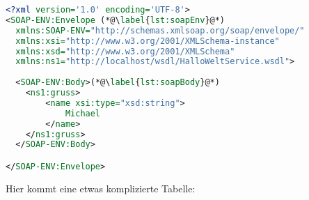 \begin{center}
\begin{lstlisting}[caption={SOAP Anfrage an einen HalloWelt-Web-Service},label=lst:soap,language=XML,label={lst:soap}]
<?xml version='1.0' encoding='UTF-8'>
<SOAP-ENV:Envelope (*@\label{lst:soapEnv}@*)
  xmlns:SOAP-ENV="http://schemas.xmlsoap.org/soap/envelope/"
  xmlns:xsi="http://www.w3.org/2001/XMLSchema-instance"
  xmlns:xsd="http://www.w3.org/2001/XMLSchema"
  xmlns:ns1="http://localhost/wsdl/HalloWeltService.wsdl">
  
  <SOAP-ENV:Body>(*@\label{lst:soapBody}@*)
  	<ns1:gruss>
  		<name xsi:type="xsd:string">
  			Michael
  		</name>
  	</ns1:gruss>
  </SOAP-ENV:Body>

</SOAP-ENV:Envelope>
\end{lstlisting}
\end{center}

\noindent Hier kommt eine etwas komplizierte Tabelle:


